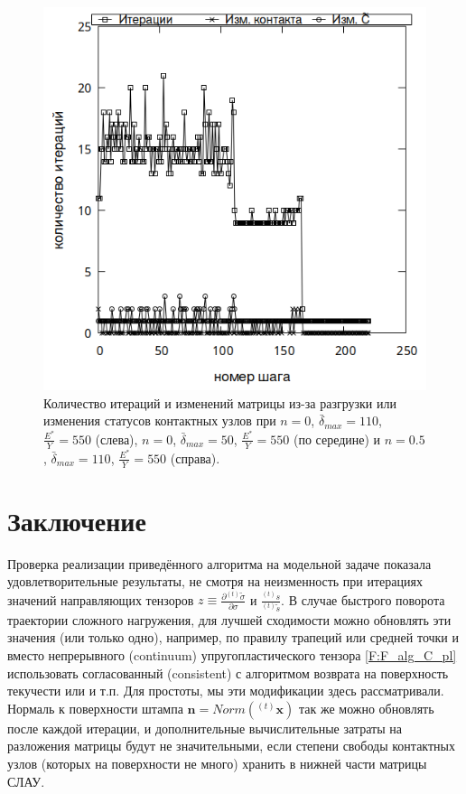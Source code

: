 \documentclass[]{article}
\begin{document}
\begin{figure}[h!]
	\includegraphics[height=0.22\textheight]{pictures/III_0.5.png}
	\caption{ Количество итераций и изменений матрицы из-за разгрузки или изменения статусов контактных узлов при ${n=0}$, ${\bar{\delta}_{max}=110}$, ${\frac{E^*}{Y}=550}$ (слева), ${n=0}$, ${\bar{\delta}_{max}=50}$, ${\frac{E^*}{Y}=550}$ (по середине) и ${n=0.5}$, ${\bar{\delta}_{max}=110}$, ${\frac{E^*}{Y}=550}$ (справа).
	}
	\label{fig:iterations}
\end{figure}



\section{Заключение}
Проверка реализации приведённого алгоритма на модельной задаче показала удовлетворительные результаты, не смотря на неизменность при итерациях значений направляющих тензоров $z\equiv\frac{\partial{}^{(t)}\tilde{\sigma}}{\partial\sigma}$ и $\frac{{}^{(t)}s}{{}^{(t)}\tilde{s}}$. В случае быстрого поворота траектории сложного нагружения, для лучшей сходимости можно обновлять эти значения (или только одно), например, по правилу трапеций или средней точки \cite{Ortiz1985} и вместо непрерывного (continuum) упругопластического тензора \eqref{F:F_alg_C_pl} использовать согласованный (consistent) с алгоритмом возврата на поверхность текучести \cite{Simo1985} или \cite{Gu2011} и т.п. Для простоты, мы эти модификации здесь рассматривали. Нормаль к поверхности штампа $\mathbf{n}=Norm\left({}^{(t)}\mathbf{x}\right)$ так же можно обновлять после каждой итерации, и дополнительные вычислительные затраты на разложения матрицы будут не значительными, если степени свободы контактных узлов (которых на поверхности не много) хранить в нижней части матрицы СЛАУ.
 
\end{document}
